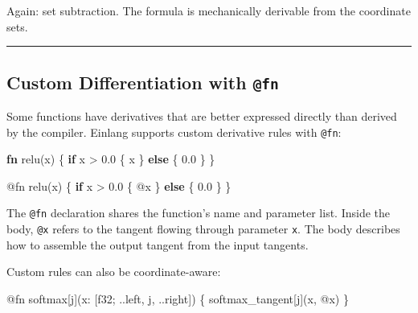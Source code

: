 \documentclass[11pt,]{article}
\newenvironment{Shaded}{}{}
\newcommand{\DataTypeTok}[1]{\textcolor[rgb]{0.56,0.13,0.00}{#1}}
\newcommand{\DecValTok}[1]{\textcolor[rgb]{0.25,0.63,0.44}{#1}}
\newcommand{\KeywordTok}[1]{\textcolor[rgb]{0.00,0.44,0.13}{\textbf{#1}}}
\newcommand{\NormalTok}[1]{#1}
\newcommand{\OperatorTok}[1]{\textcolor[rgb]{0.40,0.40,0.40}{#1}}
\begin{document}
Again: set subtraction. The formula is mechanically derivable from the
coordinate sets.

\begin{center}\rule{0.5\linewidth}{0.4pt}\end{center}

\hypertarget{custom-differentiation-with-fn}{%
\subsection{\texorpdfstring{Custom Differentiation with
\texttt{@fn}}{Custom Differentiation with @fn}}\label{custom-differentiation-with-fn}}

Some functions have derivatives that are better expressed directly than
derived by the compiler. Einlang supports custom derivative rules with
\texttt{@fn}:

\begin{Shaded}
\begin{Highlighting}[]
\KeywordTok{fn}\NormalTok{ relu(x) }\OperatorTok{\{} \KeywordTok{if}\NormalTok{ x > }\DecValTok{0.0} \OperatorTok{\{}\NormalTok{ x }\OperatorTok{\}} \KeywordTok{else} \OperatorTok{\{} \DecValTok{0.0} \OperatorTok{\}} \OperatorTok{\}}

\NormalTok{@fn relu(x) }\OperatorTok{\{}
    \KeywordTok{if}\NormalTok{ x > }\DecValTok{0.0} \OperatorTok{\{}\NormalTok{ @x }\OperatorTok{\}} \KeywordTok{else} \OperatorTok{\{} \DecValTok{0.0} \OperatorTok{\}}
\OperatorTok{\}}
\end{Highlighting}
\end{Shaded}

The \texttt{@fn} declaration shares the function's name and parameter
list. Inside the body, \texttt{@x} refers to the tangent flowing through
parameter \texttt{x}. The body describes how to assemble the output
tangent from the input tangents.

Custom rules can also be coordinate-aware:

\begin{Shaded}
\begin{Highlighting}[]
\NormalTok{@fn softmax}\OperatorTok{[}\NormalTok{j}\OperatorTok{]}\NormalTok{(x: }\OperatorTok{[}\DataTypeTok{f32}\NormalTok{; ..left, j, ..right}\OperatorTok{]}\NormalTok{) }\OperatorTok{\{}
\NormalTok{    softmax_tangent}\OperatorTok{[}\NormalTok{j}\OperatorTok{]}\NormalTok{(x, @x)}
\OperatorTok{\}}
\end{Highlighting}
\end{Shaded}
\end{document}
